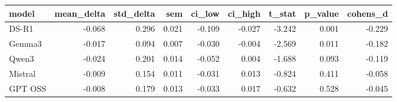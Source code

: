 \begin{tabular}{lrrrrrrrr}
\toprule
model & mean\_delta & std\_delta & sem & ci\_low & ci\_high & t\_stat & p\_value & cohens\_d \\
\midrule
DS-R1 & -0.068 & 0.296 & 0.021 & -0.109 & -0.027 & -3.242 & 0.001 & -0.229 \\
Gemma3 & -0.017 & 0.094 & 0.007 & -0.030 & -0.004 & -2.569 & 0.011 & -0.182 \\
Qwen3 & -0.024 & 0.201 & 0.014 & -0.052 & 0.004 & -1.688 & 0.093 & -0.119 \\
Mistral & -0.009 & 0.154 & 0.011 & -0.031 & 0.013 & -0.824 & 0.411 & -0.058 \\
GPT OSS & -0.008 & 0.179 & 0.013 & -0.033 & 0.017 & -0.632 & 0.528 & -0.045 \\
\bottomrule
\end{tabular}
